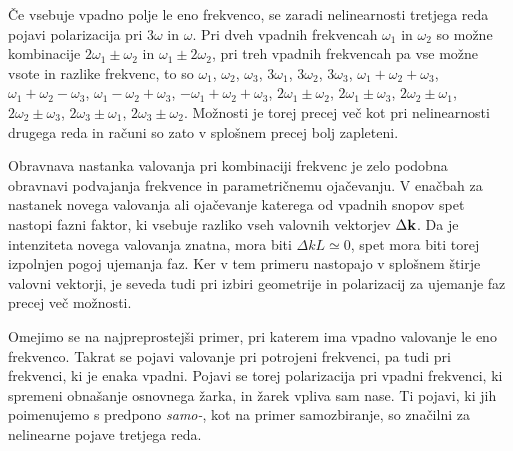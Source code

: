 Če vsebuje vpadno polje le eno frekvenco, se zaradi nelinearnosti tretjega
reda pojavi polarizacija pri 3$\omega$ in $\omega$. Pri dveh vpadnih
frekvencah $\omega_{1}$ in $\omega_{2}$ so možne kombinacije $2\omega_{1}\pm\omega_{2}$
in $\omega_{1}\pm2\omega_{2}$, pri treh vpadnih frekvencah pa vse
možne vsote in razlike frekvenc, to so $\omega_1$, $\omega_2$, $\omega_3$, 
$3\omega_1$, $3 \omega_2$, $3\omega_3$, 
$\omega_1 + \omega_2 + \omega_3$, $\omega_1 + \omega_2 - \omega_3$, 
$\omega_1 - \omega_2 + \omega_3$, $- \omega_1 + \omega_2 + \omega_3$, 
$2 \omega_1\pm\omega_2$, $2 \omega_1\pm\omega_3$, $2 \omega_2\pm\omega_1$,
$2 \omega_2\pm\omega_3$, $2 \omega_3\pm\omega_1$, $2 \omega_3\pm\omega_2$.
Možnosti je torej precej več kot pri nelinearnosti drugega reda in računi so zato 
v splošnem precej bolj zapleteni.

Obravnava nastanka valovanja pri
kombinaciji frekvenc je zelo podobna obravnavi podvajanja frekvence in parametričnemu
ojačevanju. V enačbah za nastanek novega valovanja ali ojačevanje
katerega od vpadnih snopov spet nastopi fazni faktor, ki vsebuje razliko
vseh valovnih vektorjev $\Delta{\bf k}$. Da je intenziteta novega
valovanja znatna, mora biti $\Delta kL\simeq0$, spet mora biti torej
izpolnjen pogoj ujemanja faz. Ker v tem primeru nastopajo v splošnem štirje
valovni vektorji, je seveda tudi pri izbiri geometrije in polarizacij
za ujemanje faz precej več možnosti.

Omejimo se na najpreprostejši primer, pri katerem ima vpadno valovanje le eno 
frekvenco. Takrat se pojavi valovanje pri potrojeni frekvenci, pa tudi
pri frekvenci, ki je enaka vpadni. Pojavi se torej polarizacija pri 
vpadni frekvenci, ki spremeni obnašanje osnovnega žarka, in žarek vpliva sam nase.
Ti pojavi, ki jih poimenujemo s predpono {\it samo-}, kot na primer samozbiranje, so
značilni za nelinearne pojave tretjega reda. 

